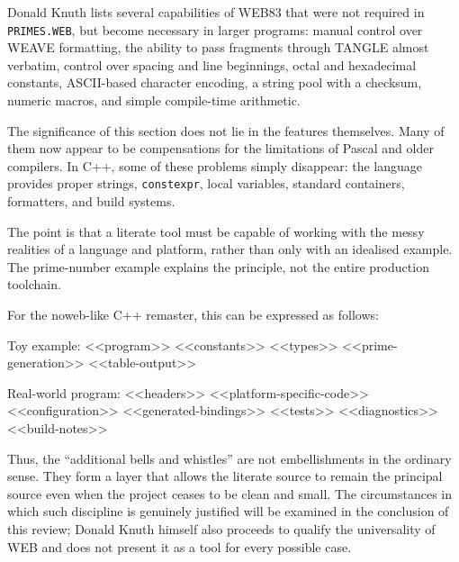 \documentclass{ZGJournalArticle_2026}
\newenvironment{Shaded}{}{}
\newcommand{\NormalTok}[1]{#1}
\begin{document}
Donald Knuth lists several capabilities of WEB83 that were not required
in \texttt{PRIMES.WEB}, but become necessary in larger programs: manual
control over WEAVE formatting, the ability to pass fragments through
TANGLE almost verbatim, control over spacing and line beginnings, octal
and hexadecimal constants, ASCII-based character encoding, a string pool
with a checksum, numeric macros, and simple compile-time arithmetic.

The significance of this section does not lie in the features
themselves. Many of them now appear to be compensations for the
limitations of Pascal and older compilers. In C++, some of these
problems simply disappear: the language provides proper strings,
\texttt{constexpr}, local variables, standard containers, formatters,
and build systems.

The point is that a literate tool must be capable of working with the
messy realities of a language and platform, rather than only with an
idealised example. The prime-number example explains the principle, not
the entire production toolchain.

For the noweb-like C++ remaster, this can be expressed as follows:

\begin{Shaded}
\begin{Highlighting}[]
\NormalTok{Toy example:}
\NormalTok{  \textless{}\textless{}program\textgreater{}\textgreater{}}
\NormalTok{  \textless{}\textless{}constants\textgreater{}\textgreater{}}
\NormalTok{  \textless{}\textless{}types\textgreater{}\textgreater{}}
\NormalTok{  \textless{}\textless{}prime{-}generation\textgreater{}\textgreater{}}
\NormalTok{  \textless{}\textless{}table{-}output\textgreater{}\textgreater{}}

\NormalTok{Real{-}world program:}
\NormalTok{  \textless{}\textless{}headers\textgreater{}\textgreater{}}
\NormalTok{  \textless{}\textless{}platform{-}specific{-}code\textgreater{}\textgreater{}}
\NormalTok{  \textless{}\textless{}configuration\textgreater{}\textgreater{}}
\NormalTok{  \textless{}\textless{}generated{-}bindings\textgreater{}\textgreater{}}
\NormalTok{  \textless{}\textless{}tests\textgreater{}\textgreater{}}
\NormalTok{  \textless{}\textless{}diagnostics\textgreater{}\textgreater{}}
\NormalTok{  \textless{}\textless{}build{-}notes\textgreater{}\textgreater{}}
\end{Highlighting}
\end{Shaded}

Thus, the ``additional bells and whistles'' are not embellishments in
the ordinary sense. They form a layer that allows the literate source to
remain the principal source even when the project ceases to be clean and
small. The circumstances in which such discipline is genuinely justified
will be examined in the conclusion of this review; Donald Knuth himself
also proceeds to qualify the universality of WEB and does not present it
as a tool for every possible case.
\end{document}
